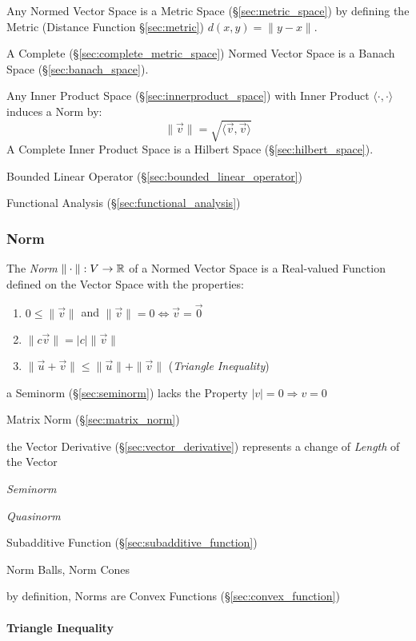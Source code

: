 Any Normed Vector Space is a Metric Space (\S\ref{sec:metric_space}) by
defining the Metric (Distance Function \S\ref{sec:metric}) $d(x,y) = \|y-x\|$.

A Complete (\S\ref{sec:complete_metric_space}) Normed Vector Space is a Banach
Space (\S\ref{sec:banach_space}).

Any Inner Product Space (\S\ref{sec:innerproduct_space}) with Inner Product
$\langle{\cdot,\cdot}\rangle$ induces a Norm by:
\[
  \|\vec{v}\| = \sqrt{\langle{\vec{v},\vec{v}}\rangle}
\]
A Complete Inner Product Space is a Hilbert Space (\S\ref{sec:hilbert_space}).

Bounded Linear Operator (\S\ref{sec:bounded_linear_operator})

Functional Analysis (\S\ref{sec:functional_analysis})



\subsubsection{Norm}\label{sec:norm}

The \emph{Norm} $\|\cdot\| : V \rightarrow \mathbb{R}$ of a Normed Vector Space is
a Real-valued Function defined on the Vector Space with the properties:
\begin{enumerate}
  \item $0 \leq \|\vec{v}\|$ and
    $\|\vec{v}\| = 0 \Leftrightarrow \vec{v} = \vec{0}$
  \item $\|c\vec{v}\| = |c|\|\vec{v}\|$
  \item $\|\vec{u} + \vec{v}\| \leq \|\vec{u}\| + \|\vec{v}\|$ (\emph{Triangle
    Inequality})
\end{enumerate}

a Seminorm (\S\ref{sec:seminorm}) lacks the Property $|v| = 0 \Longrightarrow v
= 0$

\fist Matrix Norm (\S\ref{sec:matrix_norm})

the Vector Derivative (\S\ref{sec:vector_derivative}) represents a change of
\emph{Length} of the Vector

\emph{Seminorm}

\emph{Quasinorm}

Subadditive Function (\S\ref{sec:subadditive_function})

Norm Balls, Norm Cones

by definition, Norms are Convex Functions (\S\ref{sec:convex_function})



\paragraph{Triangle Inequality}\label{sec:triangle_inequality}\hfill

